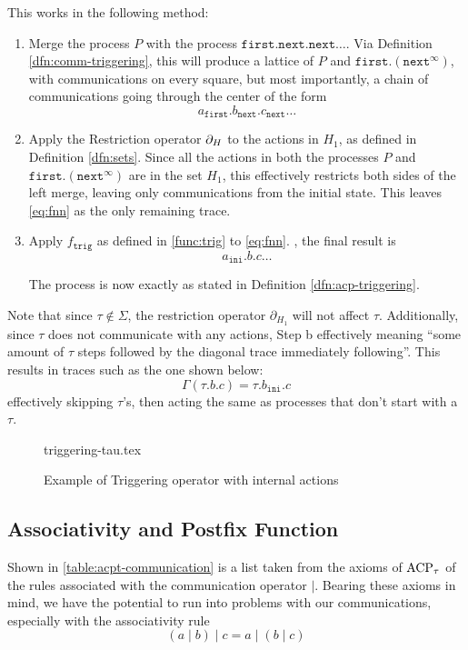 \documentclass[../hons_project.tex]{subfiles}
\begin{document}
This works in the following method:
\vspace{-5pt}
\begin{enumerate}[label=\alph*)]
	\item Merge the process $P$ with the process $\mathtt{first}.\mathtt{next}.\mathtt{next}\dots$. Via Definition \ref{dfn:comm-triggering}, this will produce a lattice of $P$ and $\mathtt{first}.(\mathtt{next}^{\infty})$, with communications on every square, but most importantly, a chain of communications going through the center of the form
	    \begin{equation}\label{eq:fnn}
			a_{\mathtt{first}}. b_{\mathtt{next}} . c_{\mathtt{next}} \dots
	    \end{equation}
	\item Apply the Restriction operator $\partial_{H}$ to the actions in $H_{1}$, as defined in Definition \ref{dfn:sets}. Since all the actions in both the processes $P$ and $\mathtt{first}.(\mathtt{next}^{\infty})$ are in the set $H_{1}$, this effectively restricts both sides of the left merge, leaving only communications from the initial state. This leaves \cref{eq:fnn} as the only remaining trace.
	\item Apply $f_{\mathtt{trig}}$ as defined in \cref{func:trig} to \cref{eq:fnn}. , the final result is
	    \begin{equation}\label{eq:gamma-result}
			a_{\mathtt{ini}}. b . c \dots
		\end{equation}

	    The process is now exactly as stated in Definition \ref{dfn:acp-triggering}.
\end{enumerate}

Note that since $\tau\not\in \Sigma$, the restriction operator $\partial_{H_{1}}$ will not affect $\tau$. Additionally, since $\tau$ does not communicate with any actions, Step b effectively meaning ``some amount of $\tau$ steps followed by the diagonal trace immediately following''. This results in traces such as the one shown below:
\[\Gamma(\tau.b.c) = \tau.b_{\mathtt{ini}}.c\]
effectively skipping $\tau$'s, then acting the same as processes that don't start with a $\tau$.

\begin{figure}[!h]
   \centering
	{triggering-tau.tex}
   \caption{Example of Triggering operator with internal actions}
   \label{fig:triggering-tau}
\end{figure}

\subsection{Associativity and Postfix Function}\label{ssec:postfix}
Shown in \cref{table:acpt-communication} is a list taken from the axioms of $\mathrm{ACP}_{\tau}$ \cite{bergstraACPtUniversalAxiom1989} of the rules associated with the communication operator $\mid$. Bearing these axioms in mind, we have the potential to run into problems with our communications, especially with the associativity rule 
\[(a \mid b) \mid c = a \mid (b \mid c)\]
\end{document}
